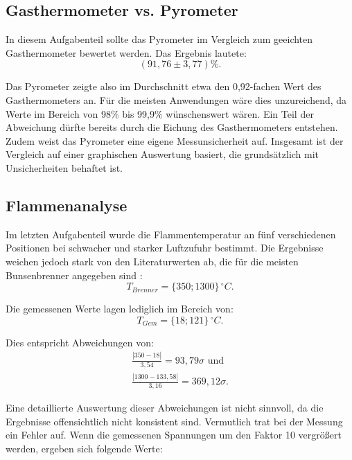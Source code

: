 \subsection*{Gasthermometer vs. Pyrometer}
In diesem Aufgabenteil sollte das Pyrometer im Vergleich zum geeichten Gasthermometer bewertet werden. Das Ergebnis lautete:
\begin{equation}
(91,76 \pm 3,77)\%.
\end{equation}

Das Pyrometer zeigte also im Durchschnitt etwa den 0,92-fachen Wert des Gasthermometers an. Für die meisten Anwendungen wäre dies unzureichend, da Werte im Bereich von 98\% bis 99,9\% wünschenswert wären. Ein Teil der Abweichung dürfte bereits durch die Eichung des Gasthermometers entstehen. Zudem weist das Pyrometer eine eigene Messunsicherheit auf. 
Insgesamt ist der Vergleich auf einer graphischen Auswertung basiert, die grundsätzlich mit Unsicherheiten behaftet ist. 

\subsection*{Flammenanalyse}
Im letzten Aufgabenteil wurde die Flammentemperatur an fünf verschiedenen Positionen bei schwacher und starker Luftzufuhr bestimmt.
Die Ergebnisse weichen jedoch stark von den Literaturwerten ab, die für die meisten Bunsenbrenner angegeben sind \cite{wikipedia-bunsenbrenner}:
\begin{equation}
    T_{Brenner} = \{350;1300\} \, ^\circ C.
\end{equation}

Die gemessenen Werte lagen lediglich im Bereich von:
\begin{equation}
    T_{Gem} = \{18;121\} \, ^\circ C.
\end{equation}

Dies entspricht Abweichungen von:
\begin{align}
    \frac{\left| 350-18 \right|}{3,54} = 93,79\sigma \text{ und }\\
    \frac{\left| 1300-133,58 \right|}{3,16} = 369,12\sigma.
\end{align}

Eine detaillierte Auswertung dieser Abweichungen ist nicht sinnvoll, da die Ergebnisse offensichtlich nicht konsistent sind. 
Vermutlich trat bei der Messung ein Fehler auf. Wenn die gemessenen Spannungen um den Faktor 10 vergrößert werden, ergeben sich folgende Werte:

